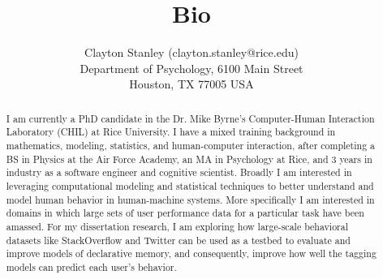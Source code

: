 \documentclass[english]{article}
\title{Bio}
\author{Clayton Stanley (clayton.stanley@rice.edu) \\
  Department of Psychology, 6100 Main Street \\
  Houston, TX 77005 USA 
}
\begin{document}
\maketitle

\begin{abstract}
  I am currently a PhD candidate in the Dr. Mike Byrne's Computer-Human Interaction Laboratory (CHIL) at Rice University.
  I have a mixed training background in mathematics, modeling, statistics, and human-computer interaction,
  after completing a BS in Physics at the Air Force Academy, an MA in Psychology at Rice, and 3 years in industry as a software engineer and cognitive scientist.
  Broadly I am interested in leveraging computational modeling and statistical techniques to better understand and model human behavior in human-machine systems.
  More specifically I am interested in domains in which large sets of user performance data for a particular task have been amassed.
  For my dissertation research, I am exploring how large-scale behavioral datasets like StackOverflow and Twitter can be used as a testbed to evaluate and improve models of declarative memory, and consequently, 
  improve how well the tagging models can predict each user's behavior. 
\end{abstract}
\end{document}
